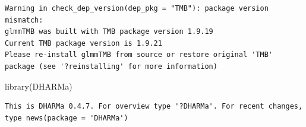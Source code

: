\documentclass[
  letterpaper,
  DIV=11,
  numbers=noendperiod]{scrartcl}
\newenvironment{Shaded}{\begin{snugshade}}{\end{snugshade}}
\newcommand{\FunctionTok}[1]{\textcolor[rgb]{0.28,0.35,0.67}{#1}}
\newcommand{\NormalTok}[1]{\textcolor[rgb]{0.00,0.23,0.31}{#1}}
\begin{document}
\begin{verbatim}
Warning in check_dep_version(dep_pkg = "TMB"): package version mismatch: 
glmmTMB was built with TMB package version 1.9.19
Current TMB package version is 1.9.21
Please re-install glmmTMB from source or restore original 'TMB' package (see '?reinstalling' for more information)
\end{verbatim}

\begin{Shaded}
\begin{Highlighting}[]
\FunctionTok{library}\NormalTok{(DHARMa)}
\end{Highlighting}
\end{Shaded}

\begin{verbatim}
This is DHARMa 0.4.7. For overview type '?DHARMa'. For recent changes, type news(package = 'DHARMa')
\end{verbatim}
\end{document}
